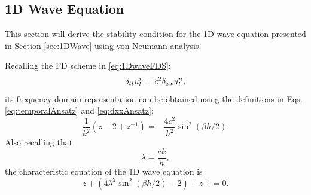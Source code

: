 {{\subsection{1D Wave Equation}\label{sec:vonNeumann1DWave}
This section will derive the stability condition for the 1D wave equation presented in Section \ref{sec:1DWave} using von Neumann analysis.

Recalling the FD scheme in \eqref{eq:1DwaveFDS}:
\begin{equation*}
    \delta_{tt} u_l^n = c^2 \delta_{xx} u_l^n,
\end{equation*}
its frequency-domain representation can be obtained using the definitions in Eqs. \eqref{eq:temporalAnsatz} and \eqref{eq:dxxAnsatz}:
\begin{equation}
    \frac{1}{k^2}\left(z - 2 + z^{-1}\right) = -\frac{4c^2}{h^2}\sin^2\left(\beta h / 2\right).
\end{equation}
Also recalling that
\begin{equation*}
    \lambda = \frac{ck}{h},
\end{equation*}
the characteristic equation of the 1D wave equation is
\begin{equation}\label{eq:1dWaveCharacteristic}
    z + \left(4\lambda^2\sin^2(\beta h / 2) -2\right) + z^{-1} = 0.
\end{equation}
}}
